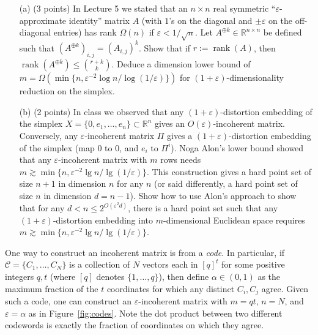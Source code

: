 \documentclass[12pt]{article}
\newcommand{\eps}{\varepsilon}
\newcommand{\R}{\mathbb{R}}
\begin{document}
\begin{itemize}
\item[(a)] (3 points) In Lecture 5 we stated that an $n\times n$ real symmetric ``$\eps$-approximate identity'' matrix $A$ (with $1$'s on the diagonal and $\pm\eps$ on the off-diagonal entries) has rank $\Omega(n)$ if $\eps < 1/\sqrt{n}$. Let $A^{\oplus k}\in\R^{n\times n}$ be defined such that $(A^{\oplus k})_{i,j} = (A_{i,j})^k$. Show that if $r:=\mathop{rank}(A)$, then $\mathop{rank}(A^{\oplus k}) \le \binom{r+k}k$. Deduce a dimension lower bound of $m = \Omega(\min\{n,\eps^{-2}\log n / \log(1/\eps)\})$ for $(1+\eps)$-dimensionality reduction on the simplex.
\item[(b)] (2 points) In class we observed that any $(1+\eps)$-distortion embedding of the simplex $X = \{0,e_1,\ldots,e_n\} \subset\R^n$ gives an $O(\eps)$-incoherent matrix. Conversely, any $\eps$-incoherent matrix $\Pi$ gives a $(1+\eps)$-distortion embedding of the simplex (map $0$ to $0$, and $e_i$ to $\Pi^i$). Noga Alon's lower bound showed that any $\eps$-incoherent matrix with $m$ rows needs $m \gtrsim \min\{n, \eps^{-2}\lg n / \lg(1/\eps)\}$. This construction gives a hard point set of size $n+1$ in dimension $n$ for any $n$ (or said differently, a hard point set of size $n$ in dimension $d = n-1$). Show how to use Alon's approach to show that for any $d < n \le 2^{O(\eps^2 d)}$, there is a hard point set such that any $(1+\eps)$-distortion embedding into $m$-dimensional Euclidean space requires $m \gtrsim \min\{n, \eps^{-2}\lg n / \lg(1/\eps)\}$.
\end{itemize}

One way to construct an incoherent matrix is from a {\em code}. In particular, if $\mathcal{C} = \{C_1,\ldots,C_N\}$ is a collection of $N$ vectors each in $[q]^t$ for some positive integers $q,t$ (where $[q]$ denotes $\{1,\ldots,q\}$), then define $\alpha\in(0,1)$ as the maximum fraction of the $t$ coordinates for which any distinct $C_i,C_j$ agree. Given such a code, one can construct an $\eps$-incoherent matrix with $m = qt$, $n = N$, and $\eps=\alpha$ as in Figure~\ref{fig:codes}.  Note the dot product between two different codewords is exactly the fraction of coordinates on which they agree.
\end{document}
